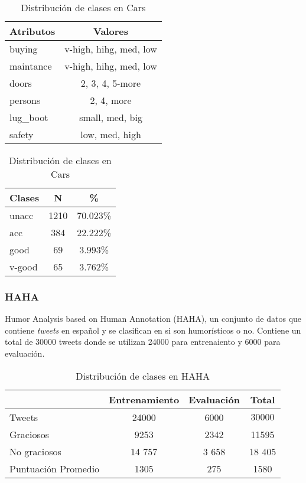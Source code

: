 \begin{table}[ht]
    \centering
    \parbox{.45\linewidth}{
    \begin{tabular} { |l|c| }
        \hline
        Atributos & Valores \\
        \hline
        \hline
        buying & v-high, hihg, med, low \\
        \hline
        maintance &  v-high, hihg, med, low\\
        \hline
        doors & 2, 3, 4, 5-more\\
        \hline
        persons & 2, 4, more\\
        \hline
        lug\_boot & small, med, big\\
        \hline
        safety & low, med, high\\
        \hline
    \end{tabular}
    \caption{Tipos de Atributos en Cars}
    \label{implementation:table:cars:attributes}
    }
    \qquad
    \parbox[t]{.45\linewidth}{
    \begin{tabular} {|l|c|c|}
        \hline
        Clases & N & \% \\
        \hline
        \hline
        unacc & 1210 & 70.023\%\\
        \hline
        acc & 384 & 22.222\%\\
        \hline
        good & 69 & 3.993\%\\
        \hline
        v-good & 65 & 3.762\%\\
        \hline
    \end{tabular}
    \caption{Distribuci\'on de clases en Cars}
    \label{implementation:table:cars:classes}
    }
\end{table}

\subsubsection{HAHA}
Humor Analysis based on Human Annotation (HAHA), un conjunto de datos que contiene \textit{tweets} en espa\~nol y se clasifican en si son humor\'isticos o no. Contiene un total de 30000 tweets donde se utilizan 24000 para entrenaiento y 6000 para evaluaci\'on.

\begin{table}[ht]
    \centering
    \begin{tabular} {|l||c|c|c|}
        \hline
        & Entrenamiento & Evaluaci\'on & Total \\
        \hline
        \hline
        Tweets & 24000 & 6000 & $30000$\\
        \hline
        Graciosos & 9253 & 2342 & 11595\\
        \hline
        No graciosos & 14 757 & 3 658 & 18 405\\
        \hline
        Puntuaci\'on Promedio & 1305 & 275 & 1580\\
        \hline
    \end{tabular}
    \caption{Distribuci\'on de clases en HAHA}
    \label{implementation:table:haha}
\end{table}


